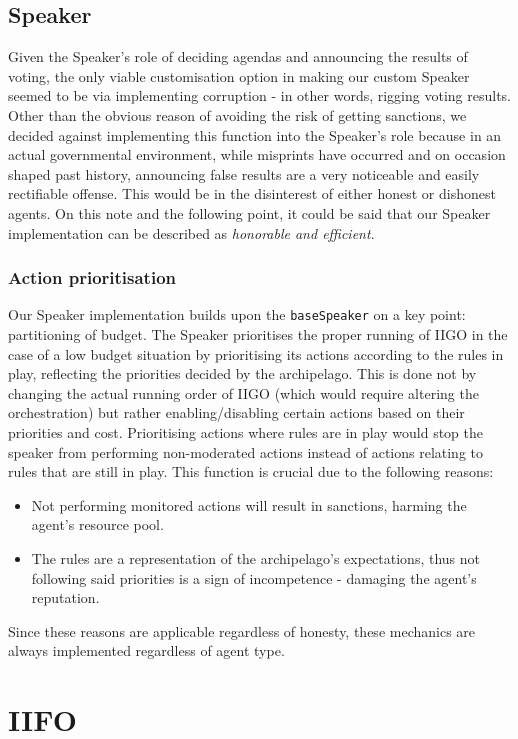 \subsection{Speaker}
Given the Speaker's role of deciding agendas and announcing the results of voting, the only viable customisation option in making our custom Speaker seemed to be via implementing corruption - in other words, rigging voting results. Other than the obvious reason of avoiding the risk of getting sanctions, we decided against implementing this function into the Speaker's role because in an actual governmental environment, while misprints have occurred and on occasion shaped past history, announcing false results are a very noticeable and easily rectifiable offense. This would be in the disinterest of either honest or dishonest agents. On this note and the following point, it could be said that our Speaker implementation can be described as \emph{honorable and efficient}.

\subsubsection{Action prioritisation}

Our Speaker implementation builds upon the \texttt{baseSpeaker} on a key point: partitioning of budget. The Speaker prioritises the proper running of IIGO in the case of a low budget situation by prioritising its actions according to the rules in play, reflecting the priorities decided by the archipelago. This is done not by changing the actual running order of IIGO (which would require altering the orchestration) but rather enabling/disabling certain actions based on their priorities and cost. Prioritising actions where rules are in play would stop the speaker from performing non-moderated actions instead of actions relating to rules that are still in play. This function is crucial due to the following reasons:
\begin{itemize}
    \item Not performing monitored actions will result in sanctions, harming the agent's resource pool.
    \item The rules are a representation of the archipelago's expectations, thus not following said priorities is a sign of incompetence - damaging the agent's reputation.
\end{itemize}
Since these reasons are applicable regardless of honesty, these mechanics are always implemented regardless of agent type.

\section{IIFO}\label{sec:team4:IIFO}

